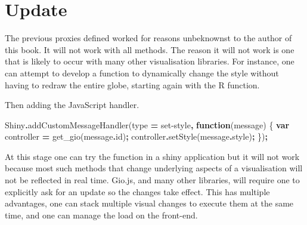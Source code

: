 \documentclass[
]{krantz}
\makeatletter
\newenvironment{Shaded}{\begin{snugshade}}{\end{snugshade}}
\newcommand{\AttributeTok}[1]{\textcolor[rgb]{0.61,0.61,0.61}{#1}}
\newcommand{\CommentTok}[1]{\textcolor[rgb]{0.37,0.37,0.37}{\textit{#1}}}
\newcommand{\ControlFlowTok}[1]{\textcolor[rgb]{0.27,0.27,0.27}{\textbf{#1}}}
\newcommand{\DataTypeTok}[1]{\textcolor[rgb]{0.27,0.27,0.27}{#1}}
\newcommand{\FunctionTok}[1]{\textcolor[rgb]{0,0,0}{#1}}
\newcommand{\KeywordTok}[1]{\textcolor[rgb]{0.27,0.27,0.27}{\textbf{#1}}}
\newcommand{\NormalTok}[1]{#1}
\newcommand{\OperatorTok}[1]{\textcolor[rgb]{0.43,0.43,0.43}{\textbf{#1}}}
\newcommand{\StringTok}[1]{\textcolor[rgb]{0.5,0.5,0.5}{#1}}
\newenvironment{kframe}{%
\medskip{}
\setlength{\fboxsep}{.8em}
 \def\at@end@of@kframe{}%
 \ifinner\ifhmode%
  \def\at@end@of@kframe{\end{minipage}}%
  \begin{minipage}{\columnwidth}%
 \fi\fi%
 \def\FrameCommand##1{\hskip\@totalleftmargin \hskip-\fboxsep
 \colorbox{shadecolor}{##1}\hskip-\fboxsep
     \hskip-\linewidth \hskip-\@totalleftmargin \hskip\columnwidth}%
 \MakeFramed {\advance\hsize-\width
   \@totalleftmargin\z@ \linewidth\hsize
   \@setminipage}}%
 {\par\unskip\endMakeFramed%
 \at@end@of@kframe}
\renewenvironment{Shaded}{\begin{kframe}}{\end{kframe}}
\makeatother
\begin{document}
\hypertarget{update}{%
\section*{Update}\label{update}}


The previous proxies defined worked for reasons unbeknownst to the author of this book. It will not work with all methods. The reason it will not work is one that is likely to occur with many other visualisation libraries. For instance, one can attempt to develop a function to dynamically change the style without having to redraw the entire globe, starting again with the R function.

\begin{Shaded}
\end{Shaded}

Then adding the JavaScript handler.

\begin{Shaded}
\begin{Highlighting}[]
\NormalTok{Shiny}\OperatorTok{.}\FunctionTok{addCustomMessageHandler}\NormalTok{(type }\OperatorTok{=} \StringTok{\textquotesingle{}set{-}style\textquotesingle{}}\OperatorTok{,} \KeywordTok{function}\NormalTok{(message) \{}
  \KeywordTok{var}\NormalTok{ controller }\OperatorTok{=}\NormalTok{ get\_gio(message}\OperatorTok{.}\AttributeTok{id}\NormalTok{)}\OperatorTok{;}
\NormalTok{  controller}\OperatorTok{.}\FunctionTok{setStyle}\NormalTok{(message}\OperatorTok{.}\AttributeTok{style}\NormalTok{)}\OperatorTok{;}
\NormalTok{\})}\OperatorTok{;}
\end{Highlighting}
\end{Shaded}

At this stage one can try the function in a shiny application but it will not work because most such methods that change underlying aspects of a visualisation will not be reflected in real time. Gio.js, and many other libraries, will require one to explicitly ask for an update so the changes take effect. This has multiple advantages, one can stack multiple visual changes to execute them at the same time, and one can manage the load on the front-end.
\end{document}
